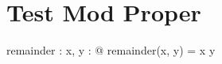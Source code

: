 \documentclass[a4paper,10pt,fleqn]{article}
\begin{document}
\section*{Test Mod Proper}

\begin{axdef}
remainder : \nat \cross \nat \fun \nat
\where
\forall x, y : \nat @ remainder(x, y) = x \mod y
\end{axdef}
\end{document}
